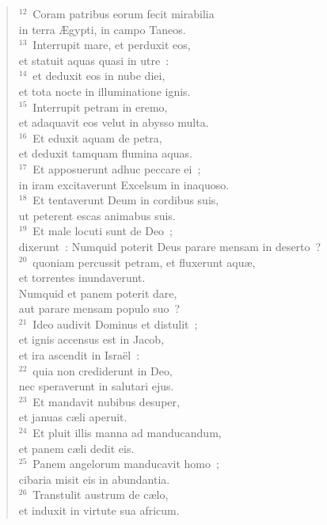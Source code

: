 \begin{flushleft}
\begin{verse}
${}^{12}$~Coram patribus eorum fecit mirabilia\\ in terra \AE gypti, in campo Taneos.\\
${}^{13}$~Interrupit mare, et perduxit eos,\\ et statuit aquas quasi in utre~:\\
${}^{14}$~et deduxit eos in nube diei,\\ et tota nocte in illuminatione ignis.\\
${}^{15}$~Interrupit petram in eremo,\\ et adaquavit eos velut in abysso multa.\\
${}^{16}$~Et eduxit aquam de petra,\\ et deduxit tamquam flumina aquas.\\
${}^{17}$~Et apposuerunt adhuc peccare ei~;\\ in iram excitaverunt Excelsum in inaquoso.\\
${}^{18}$~Et tentaverunt Deum in cordibus suis,\\ ut peterent escas animabus suis.\\
${}^{19}$~Et male locuti sunt de Deo~;\\ dixerunt~: Numquid poterit Deus parare mensam in deserto~?\\
${}^{20}$~quoniam percussit petram, et fluxerunt aqu\ae ,\\ et torrentes inundaverunt.\\ Numquid et panem poterit dare,\\ aut parare mensam populo suo~?\\
${}^{21}$~Ideo audivit Dominus et distulit~;\\ et ignis accensus est in Jacob,\\ et ira ascendit in Isra\"el~:\\
${}^{22}$~quia non crediderunt in Deo,\\ nec speraverunt in salutari ejus.\\
${}^{23}$~Et mandavit nubibus desuper,\\ et januas c\ae li aperuit.\\
${}^{24}$~Et pluit illis manna ad manducandum,\\ et panem c\ae li dedit eis.\\
${}^{25}$~Panem angelorum manducavit homo~;\\ cibaria misit eis in abundantia.\\
${}^{26}$~Transtulit austrum de c\ae lo,\\ et induxit in virtute sua africum.\\

\end{verse}
\end{flushleft}
